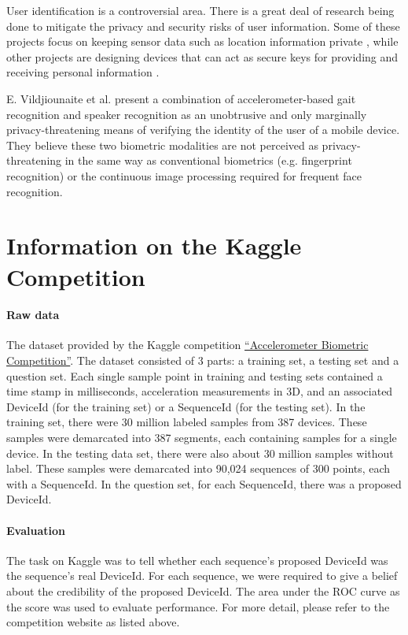 \documentclass{article} %
\begin{document}
User identification is a controversial area. There is a great deal of research being done to mitigate the privacy and security risks of user information. Some of these projects focus on keeping sensor data such as location information private \cite{Cho:ISA2004}, while other projects are designing devices that can act as secure keys for providing and receiving personal information \cite{Zhu:PCC2006}. 

E. Vildjiounaite et al.\cite{Vildjiounaite:PC2006} present a combination of accelerometer-based gait recognition and speaker recognition as an unobtrusive and only marginally privacy-threatening means of verifying the identity of the user of a mobile device. They believe these two biometric modalities are not perceived as privacy-threatening in the same way as conventional biometrics (e.g. fingerprint recognition) or the continuous image processing required for frequent face recognition.

\section{Information on the Kaggle Competition}
\paragraph{Raw data}
The dataset provided by the Kaggle competition \href{http://www.kaggle.com/c/accelerometer-biometric-competition}{``Accelerometer Biometric Competition''}. The dataset consisted of 3 parts: a training set, a testing set and a question set. Each single sample point in training and testing sets contained a time stamp in milliseconds, acceleration measurements in 3D, and an associated DeviceId (for the training set) or a SequenceId (for the testing set). In the training set, there were 30 million labeled samples from 387 devices. These samples were demarcated into 387 segments, each containing samples for a single device. In the testing data set, there were also about 30 million samples without label. These samples were demarcated into 90,024 sequences of 300 points, each with a SequenceId. In the question set, for each SequenceId, there was a proposed DeviceId.

\paragraph{Evaluation}
The task on Kaggle was to tell whether each sequence's proposed DeviceId was the sequence's real DeviceId. For each sequence, we were required to give a belief about the credibility of the proposed DeviceId. The area under the ROC curve as the score was used to evaluate performance. For more detail, please refer to the competition website as listed above.
\end{document}
